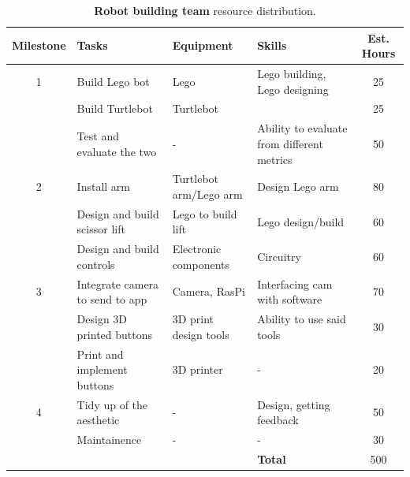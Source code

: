 \documentclass{article}
\begin{document}
\begin{table}[]
  \begin{center}
  \begin{small}
  \begin{tabular}{|c|l|l|l|c|}
    \hline
    {\bf Milestone} & {\bf Tasks} & {\bf Equipment} & {\bf Skills} & {\bf Est. Hours} \\ \hline
    1               & Build Lego bot & Lego & Lego building, Lego designing & 25 \\ \cline{2-5}
                    & Build Turtlebot & Turtlebot &  & 25 \\ \cline{2-5}
                    & Test and evaluate the two & - & Ability to evaluate from different metrics & 50 \\ \hline
    2               & Install arm & Turtlebot arm/Lego arm & Design Lego arm & 80 \\ \cline{2-5}
                    & Design and build scissor lift & Lego to build lift & Lego design/build & 60 \\ \cline{2-5}
                    & Design and build controls & Electronic components & Circuitry & 60 \\ \hline
    3               & Integrate camera to send to app & Camera, RasPi & Interfacing cam with software & 70 \\ \cline{2-5}
                    & Design 3D printed buttons & 3D print design tools & Ability to use said tools & 30 \\ \cline{2-5}
                    & Print and implement buttons & 3D printer & - & 20 \\ \hline
    4               & Tidy up of the aesthetic & - & Design, getting feedback & 50 \\ \cline{2-5}
                    & Maintainence & - & - & 30 \\ \hline
                    &                           &  & {\bf Total} & 500 \\ \hline
  \end{tabular}
  \end{small}
  \caption{{\bf Robot building team} resource distribution.}
  \end{center}
\end{table}
\end{document}
